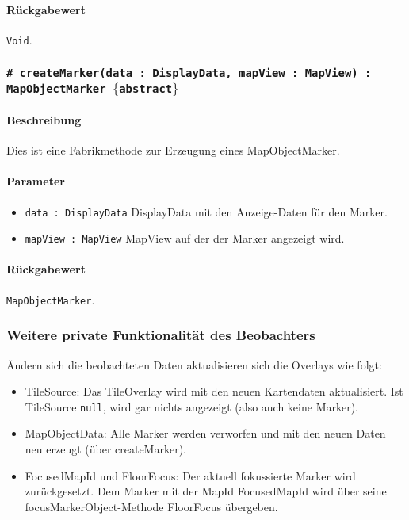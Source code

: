 \paragraph*{Rückgabewert}
\texttt{Void}.

\subsubsection*{\texttt{\# createMarker(data : DisplayData, mapView : MapView) : MapObjectMarker $\lbrace$abstract$\rbrace$}}%
\paragraph*{Beschreibung}
Dies ist eine Fabrikmethode zur Erzeugung eines MapObjectMarker.
\paragraph*{Parameter}
\begin{itemize}
    \item \texttt{data : DisplayData} DisplayData mit den Anzeige-Daten für den Marker.
    \item \texttt{mapView : MapView} MapView auf der der Marker angezeigt wird.
\end{itemize}
\paragraph*{Rückgabewert}
\texttt{MapObjectMarker}.


\subsubsection*{Weitere private Funktionalität des Beobachters}
Ändern sich die beobachteten Daten aktualisieren sich die Overlays wie folgt:
\begin{itemize}
    \item TileSource: Das TileOverlay wird mit den neuen Kartendaten aktualisiert.
    Ist TileSource \texttt{null}, wird gar nichts angezeigt (also auch keine Marker).
    \item MapObjectData: Alle Marker werden verworfen und mit den neuen Daten neu erzeugt (über createMarker).
    \item FocusedMapId und FloorFocus: Der aktuell fokussierte Marker wird zurückgesetzt.
    Dem Marker mit der MapId FocusedMapId wird über seine focusMarkerObject-Methode FloorFocus übergeben.
\end{itemize}

